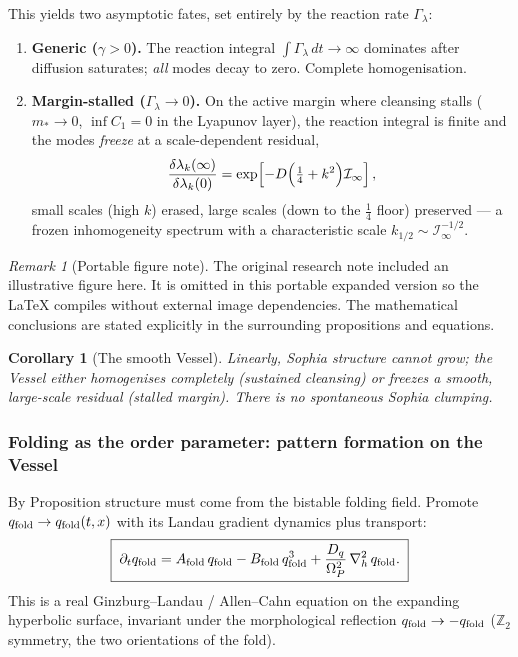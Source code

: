 \documentclass[11pt,a4paper]{article}
\newcommand{\Op}{\Omega_P}
\newcommand{\laph}{\nabla_h^2}
\newcommand{\qf}{q_{\rm fold}}
\newcommand{\Af}{A_{\rm fold}}
\newcommand{\Bf}{B_{\rm fold}}
\newcommand{\Glam}{\Gamma_\lambda}
\newcommand{\dlam}{\delta\lambda}
\theoremstyle{plain}
\newtheorem{corollary}{Corollary}[section]
\theoremstyle{definition}
\theoremstyle{remark}
\newtheorem{remark}{Remark}[section]
\begin{document}
This yields two asymptotic fates, set entirely by the reaction rate $\Glam$:
\begin{enumerate}[leftmargin=1.6em,itemsep=2pt]
\item \textbf{Generic ($\gamma>0$).} The reaction integral $\int\Glam\,dt\to\infty$ dominates after
diffusion saturates; \emph{all} modes decay to zero. Complete homogenisation.
\item \textbf{Margin-stalled ($\Glam\to0$).} On the active margin where cleansing stalls ($m_*\to0$,
$\inf C_1=0$ in the Lyapunov layer), the reaction integral is finite and the modes \emph{freeze} at a
scale-dependent residual,
\begin{equation}
\frac{\dlam_k(\infty)}{\dlam_k(0)}=\exp\!\left[-D\Bigl(\tfrac14+k^2\Bigr)\mathcal I_\infty\right],
\end{equation}
small scales (high $k$) erased, large scales (down to the $\tfrac14$ floor) preserved --- a frozen
inhomogeneity spectrum with a characteristic scale $k_{1/2}\sim\mathcal I_\infty^{-1/2}$.
\end{enumerate}


\begin{remark}[Portable figure note]
The original research note included an illustrative figure here. It is omitted in this portable expanded version so the LaTeX compiles without external image dependencies. The mathematical conclusions are stated explicitly in the surrounding propositions and equations.\end{remark}


\begin{corollary}[The smooth Vessel]
Linearly, Sophia structure cannot grow; the Vessel either homogenises completely (sustained cleansing)
or freezes a smooth, large-scale residual (stalled margin). There is no spontaneous Sophia clumping.
\end{corollary}

\subsubsection{Folding as the order parameter: pattern formation on the Vessel}

By Proposition structure must come from the bistable folding field. Promote
$\qf\to\qf(t,x)$ with its Landau gradient dynamics plus transport:
\begin{equation}
\boxed{\;\partial_t\qf=\Af\,\qf-\Bf\,\qf^{3}+\frac{D_q}{\Op^2}\,\laph\,\qf.\;}
\end{equation}
This is a real Ginzburg--Landau / Allen--Cahn equation on the expanding hyperbolic surface, invariant
under the morphological reflection $\qf\to-\qf$ ($\mathbb Z_2$ symmetry, the two orientations of the
fold).
\end{document}
